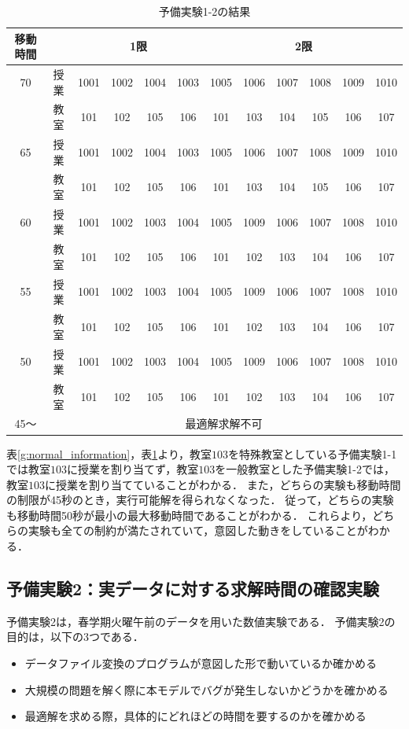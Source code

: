 \documentclass[12pt, a4paper, fleqn]{jreport}
\begin{document}
\begin{table}[H]
\caption{予備実験1-2の結果}
\label{h:normal_information}
\begin{center}
\begin{tabular}{|c|c||cccc|cccccc|}
\hline
移動時間& & \multicolumn{4}{|c|}{1限} &  \multicolumn{6}{|c|}{2限} \\
\hline
70 & 授業 & 1001 & 1002 & 1004 & 1003 & 1005 & 1006 & 1007 & 1008 & 1009 & 1010 \\
& 教室 & 101 & 102 & 105 & 106 & 101 & 103 & 104 & 105 & 106 & 107 \\ \cline{2-11}
\hline
65 & 授業 & 1001 & 1002 & 1004 & 1003 & 1005 & 1006 & 1007 & 1008 & 1009 & 1010 \\
& 教室 & 101 & 102 & 105 & 106 & 101 & 103 & 104 & 105 & 106 & 107 \\\cline{2-11}
\hline
60 & 授業 & 1001 & 1002 & 1003 & 1004 & 1005 & 1009 & 1006 & 1007 & 1008 & 1010 \\
& 教室 & 101 & 102 & 105 & 106 & 101 & 102 & 103 & 104 & 106 & 107 \\ \cline{2-11}
\hline
55 & 授業 & 1001 & 1002 & 1003 & 1004 & 1005 & 1009 & 1006 & 1007 & 1008 & 1010 \\
& 教室 & 101 & 102 & 105 & 106 & 101 & 102 & 103 & 104 & 106 & 107 \\ \cline{2-11}
\hline
50 & 授業 & 1001 & 1002 & 1003 & 1004 & 1005 & 1009 & 1006 & 1007 & 1008 & 1010 \\
& 教室 & 101 & 102 & 105 & 106 & 101 & 102 & 103 & 104 & 106 & 107 \\ \cline{2-11}
\hline
45～  &  \multicolumn{11}{|c|}{最適解求解不可}\\
\hline
\end{tabular}
\end{center}
\end{table}

表\ref{g:normal_information}，表\ref{h:normal_information}より，教室$103$を特殊教室としている予備実験1-1では教室$103$に授業を割り当てず，教室$103$を一般教室とした予備実験1-2では，教室$103$に授業を割り当てていることがわかる．
また，どちらの実験も移動時間の制限が45秒のとき，実行可能解を得られなくなった．
従って，どちらの実験も移動時間50秒が最小の最大移動時間であることがわかる．
これらより，どちらの実験も全ての制約が満たされていて，意図した動きをしていることがわかる．


\subsection{予備実験2：実データに対する求解時間の確認実験}
予備実験2は，春学期火曜午前のデータを用いた数値実験である．
予備実験2の目的は，以下の3つである．
\begin{itemize}
\item{データファイル変換のプログラムが意図した形で動いているか確かめる}
\item{大規模の問題を解く際に本モデルでバグが発生しないかどうかを確かめる}
\item{最適解を求める際，具体的にどれほどの時間を要するのかを確かめる}
\end{itemize}
\end{document}
